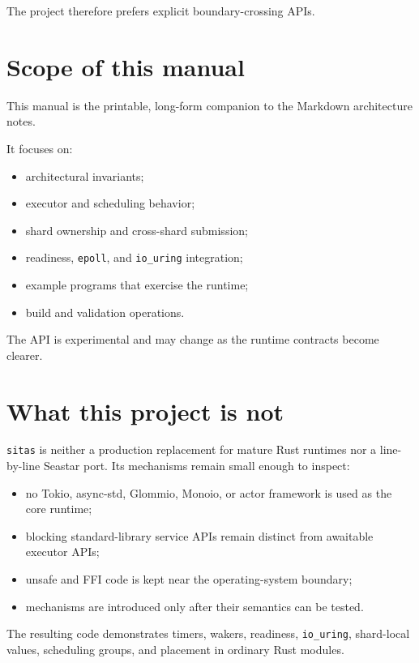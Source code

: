 The project therefore prefers explicit boundary-crossing APIs.

\section{Scope of this manual}

This manual is the printable, long-form companion to the Markdown architecture
notes.

It focuses on:

\begin{itemize}
    \item architectural invariants;
    \item executor and scheduling behavior;
    \item shard ownership and cross-shard submission;
    \item readiness, \texttt{epoll}, and \texttt{io\_uring} integration;
    \item example programs that exercise the runtime;
    \item build and validation operations.
\end{itemize}

\begin{notabene}
The API is experimental and may change as the runtime contracts become clearer.
\end{notabene}

\section{What this project is not}

\texttt{sitas} is neither a production replacement for mature Rust runtimes
nor a line-by-line Seastar port. Its mechanisms remain small enough to inspect:

\begin{itemize}
    \item no Tokio, async-std, Glommio, Monoio, or actor framework is used as
          the core runtime;
    \item blocking standard-library service APIs remain distinct from
          awaitable executor APIs;
    \item unsafe and FFI code is kept near the operating-system boundary;
    \item mechanisms are introduced only after their semantics can be tested.
\end{itemize}

The resulting code demonstrates timers, wakers, readiness, \texttt{io\_uring},
shard-local values, scheduling groups, and placement in ordinary Rust modules.

